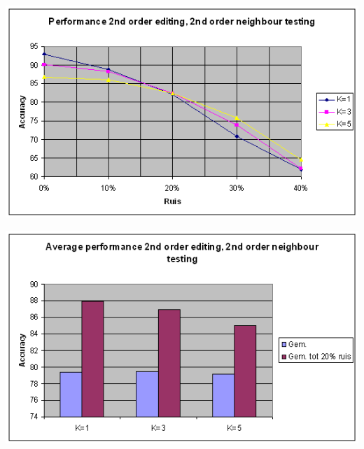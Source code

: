 \documentclass{article}
\begin{document}
\begin{center} \includegraphics[scale=0.7]{xor_2ndordedit_2ndordtest_lijn} \end{center}
\begin{center} \includegraphics[scale=0.7]{xor_2ndordedit_2ndordtest_staaf} \end{center}
\end{document}
